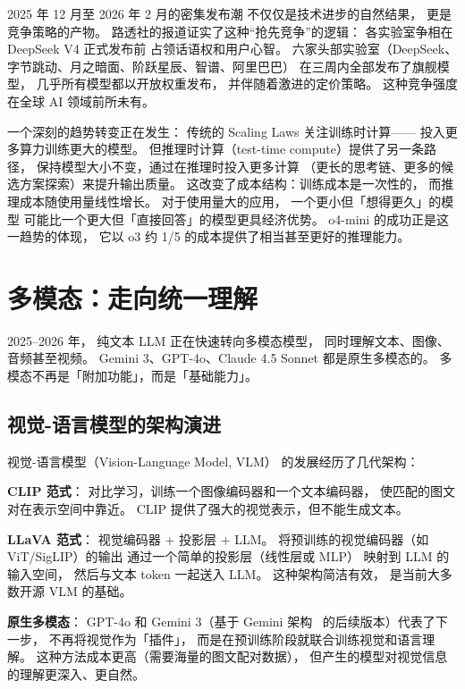 \begin{corebox}[2026 年春季模型发布潮的竞争动态]
2025 年 12 月至 2026 年 2 月的密集发布潮
不仅仅是技术进步的自然结果，
更是竞争策略的产物。
路透社的报道证实了这种“抢先竞争”的逻辑：
各实验室争相在 DeepSeek V4 正式发布前
占领话语权和用户心智。
六家头部实验室（DeepSeek、字节跳动、月之暗面、阶跃星辰、智谱、阿里巴巴）
在三周内全部发布了旗舰模型，
几乎所有模型都以开放权重发布，
并伴随着激进的定价策略。
这种竞争强度在全球 AI 领域前所未有。
\end{corebox}

\begin{whybox}
一个深刻的趋势转变正在发生：
传统的 Scaling Laws 关注训练时计算——
投入更多算力训练更大的模型。
但推理时计算（test-time compute）提供了另一条路径，
保持模型大小不变，通过在推理时投入更多计算
（更长的思考链、更多的候选方案探索）来提升输出质量。
这改变了成本结构：训练成本是一次性的，
而推理成本随使用量线性增长。
对于使用量大的应用，
一个更小但「想得更久」的模型
可能比一个更大但「直接回答」的模型更具经济优势。
o4-mini 的成功正是这一趋势的体现，
它以 o3 约 1/5 的成本提供了相当甚至更好的推理能力。
\end{whybox}

\section{多模态：走向统一理解}

2025--2026 年，
纯文本 LLM 正在快速转向多模态模型，
同时理解文本、图像、音频甚至视频。
Gemini 3、GPT-4o、Claude 4.5 Sonnet 都是原生多模态的。
多模态不再是「附加功能」，而是「基础能力」。

\subsection{视觉-语言模型的架构演进}

视觉-语言模型（Vision-Language Model, VLM）
的发展经历了几代架构：

\textbf{CLIP 范式}：
对比学习，训练一个图像编码器和一个文本编码器，
使匹配的图文对在表示空间中靠近。
CLIP 提供了强大的视觉表示，但不能生成文本。

\textbf{LLaVA 范式}：
视觉编码器 + 投影层 + LLM。
将预训练的视觉编码器（如 ViT/SigLIP）的输出
通过一个简单的投影层（线性层或 MLP）
映射到 LLM 的输入空间，
然后与文本 token 一起送入 LLM。
这种架构简洁有效，
是当前大多数开源 VLM 的基础。

\textbf{原生多模态}：
GPT-4o 和 Gemini 3（基于 Gemini 架构~\cite{anil2023gemini} 的后续版本）代表了下一步，
不再将视觉作为「插件」，
而是在预训练阶段就联合训练视觉和语言理解。
这种方法成本更高（需要海量的图文配对数据），
但产生的模型对视觉信息的理解更深入、更自然。

